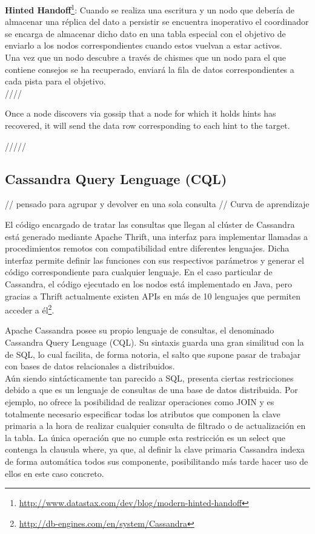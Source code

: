 \textbf{Hinted Handoff}\footnote{\url{http://www.datastax.com/dev/blog/modern-hinted-handoff}}: Cuando se realiza una escritura y un nodo que debería de almacenar una réplica del dato a persistir se encuentra inoperativo el coordinador se encarga de almacenar dicho dato en una tabla especial con el objetivo de enviarlo a los nodos correspondientes cuando estos vuelvan a estar activos.\\

Una vez que un nodo descubre a través de chismes que un nodo para el que contiene consejos se ha recuperado, enviará la fila de datos correspondientes a cada pista para el objetivo.\\

////

Once a node discovers via gossip that a node for which it holds hints has recovered, it will send the data row corresponding to each hint to the target.

/////

\subsection{Cassandra Query Lenguage (CQL)}

// pensado para agrupar y devolver en una sola consulta
// Curva de aprendizaje

El código encargado de tratar las consultas que llegan al clúster de Cassandra está generado mediante Apache Thrift\cite{slee2007thrift}, una interfaz para implementar llamadas a procedimientos remotos\cite{nelson1981remote} con compatibilidad entre diferentes lenguajes. Dicha interfaz permite definir las funciones con sus respectivos parámetros y generar el código correspondiente para cualquier lenguaje. En el caso particular de Cassandra, el código ejecutado en los nodos está implementado en Java, pero gracias a Thrift actualmente existen {APIs} en más de 10 lenguajes que permiten acceder a él\footnote{\url{http://db-engines.com/en/system/Cassandra}}.


Apache Cassandra posee su propio lenguaje de consultas, el denominado Cassandra Query Lenguage (CQL). Su sintaxis guarda una gran similitud con la de SQL, lo cual facilita, de forma notoria, el salto que supone pasar de trabajar con bases de datos relacionales a distribuidos.\\

Aún siendo sintácticamente  tan parecido a SQL, presenta ciertas restricciones debido a que es un lenguaje de consultas de una base de datos distribuida. Por ejemplo, no ofrece la posibilidad de realizar operaciones como JOIN y es totalmente necesario especificar todas los atributos que componen la clave primaria a la hora de realizar cualquier consulta de filtrado o de actualización en la tabla. La única operación que no cumple esta restricción es un select que contenga la clausula where, ya que, al definir la clave primaria Cassandra indexa de forma automática todos sus componente, posibilitando más tarde  hacer uso de ellos en este caso concreto.
  
